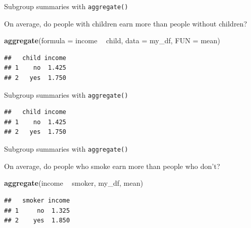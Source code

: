 \documentclass[ignorenonframetext,]{beamer}
\newenvironment{Shaded}{\begin{snugshade}}{\end{snugshade}}
\newcommand{\DataTypeTok}[1]{\textcolor[rgb]{0.13,0.29,0.53}{#1}}
\newcommand{\KeywordTok}[1]{\textcolor[rgb]{0.13,0.29,0.53}{\textbf{#1}}}
\newcommand{\NormalTok}[1]{#1}
\newcommand{\OperatorTok}[1]{\textcolor[rgb]{0.81,0.36,0.00}{\textbf{#1}}}
\newcommand{\StringTok}[1]{\textcolor[rgb]{0.31,0.60,0.02}{#1}}
\begin{document}
\begin{frame}[fragile]{Subgroup summaries with \texttt{aggregate()}}
\protect\hypertarget{subgroup-summaries-with-aggregate-3}{}

On average, do people with children earn more than people without
children?

\begin{Shaded}
\begin{Highlighting}[]
\KeywordTok{aggregate}\NormalTok{(}\DataTypeTok{formula =}\NormalTok{ income }\OperatorTok{~}\StringTok{ }\NormalTok{child,}
          \DataTypeTok{data =}\NormalTok{ my_df, }
          \DataTypeTok{FUN =}\NormalTok{ mean)}
\end{Highlighting}
\end{Shaded}

\begin{verbatim}
##   child income
## 1    no  1.425
## 2   yes  1.750
\end{verbatim}

\end{frame}

\begin{frame}[fragile]{Subgroup summaries with \texttt{aggregate()}}
\protect\hypertarget{subgroup-summaries-with-aggregate-4}{}

\begin{Shaded}
\end{Shaded}

\begin{verbatim}
##   child income
## 1    no  1.425
## 2   yes  1.750
\end{verbatim}

\end{frame}

\begin{frame}[fragile]{Subgroup summaries with \texttt{aggregate()}}
\protect\hypertarget{subgroup-summaries-with-aggregate-5}{}

On average, do people who smoke earn more than people who don't?

\begin{Shaded}
\begin{Highlighting}[]
\KeywordTok{aggregate}\NormalTok{(income }\OperatorTok{~}\StringTok{ }\NormalTok{smoker, my_df, mean)}
\end{Highlighting}
\end{Shaded}

\begin{verbatim}
##   smoker income
## 1     no  1.325
## 2    yes  1.850
\end{verbatim}

\end{frame}
\end{document}
